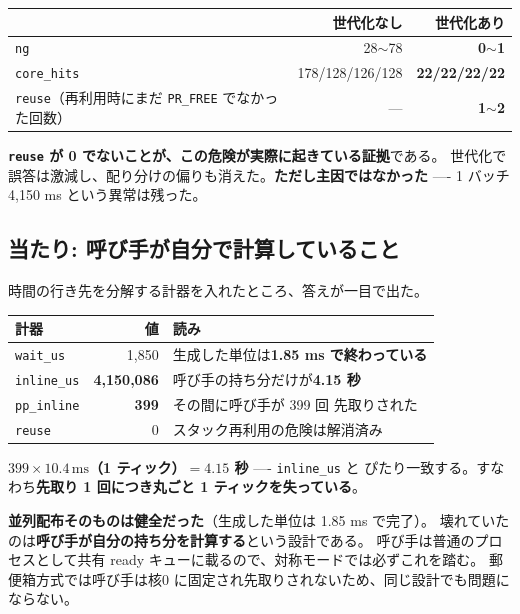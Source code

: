 \documentclass[a4paper,11pt]{ltjsarticle}
\begin{document}
\begin{center}
\begin{tabular}{lrr}
\toprule
 & 世代化なし & \textbf{世代化あり} \\
\midrule
\texttt{ng} & 28$\sim$78 & \textbf{0$\sim$1} \\
\texttt{core\_hits} & 178/128/126/128 & \textbf{22/22/22/22} \\
\texttt{reuse}（再利用時にまだ \texttt{PR\_FREE} でなかった回数） & --- & \textbf{1$\sim$2} \\
\bottomrule
\end{tabular}
\end{center}

\noindent
\textbf{\texttt{reuse} が 0 でないことが、この危険が実際に起きている証拠}である。
世代化で誤答は激減し、配り分けの偏りも消えた。\textbf{ただし主因ではなかった}
---- 1 バッチ 4{,}150 ms という異常は残った。

\subsection{当たり: 呼び手が自分で計算していること}
時間の行き先を分解する計器を入れたところ、答えが一目で出た。

\begin{center}
\begin{tabular}{lrl}
\toprule
計器 & 値 & 読み \\
\midrule
\texttt{wait\_us} & 1{,}850 & 生成した単位は\textbf{1.85 ms で終わっている} \\
\texttt{inline\_us} & \textbf{4{,}150{,}086} & 呼び手の持ち分だけが\textbf{4.15 秒} \\
\texttt{pp\_inline} & \textbf{399} & その間に呼び手が 399 回 先取りされた \\
\texttt{reuse} & 0 & スタック再利用の危険は解消済み \\
\bottomrule
\end{tabular}
\end{center}

\noindent
\textbf{$399 \times 10.4\,\mathrm{ms}$（1 ティック）$= 4.15$ 秒} ---- \texttt{inline\_us} と
ぴたり一致する。すなわち\textbf{先取り 1 回につき丸ごと 1 ティックを失っている}。

\textbf{並列配布そのものは健全だった}（生成した単位は 1.85 ms で完了）。
壊れていたのは\textbf{呼び手が自分の持ち分を計算する}という設計である。
呼び手は普通のプロセスとして共有 ready キューに載るので、対称モードでは必ずこれを踏む。
郵便箱方式では呼び手は核0 に固定され先取りされないため、同じ設計でも問題にならない。
\end{document}
